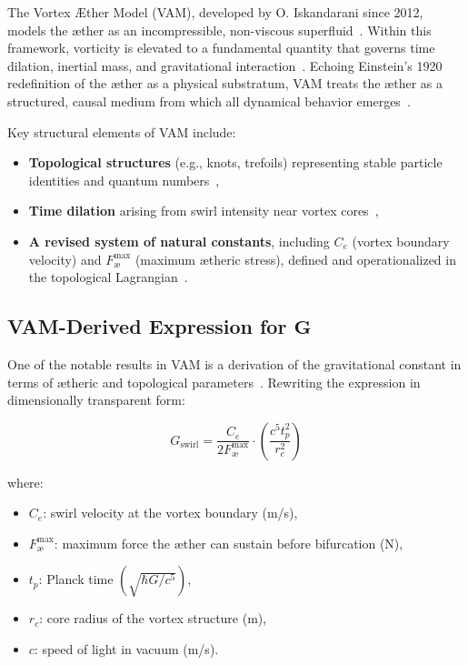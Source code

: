 The Vortex Æther Model (VAM), developed by O. Iskandarani since 2012, models the æther as an incompressible, non-viscous superfluid~\cite{VAM-8, VAM-13}. Within this framework, vorticity is elevated to a fundamental quantity that governs time dilation, inertial mass, and gravitational interaction~\cite{VAM-2, VAM-10, VAM-13}. Echoing Einstein’s 1920 redefinition of the æther as a physical substratum, VAM treats the æther as a structured, causal medium from which all dynamical behavior emerges~\cite{VAM-8}.

Key structural elements of VAM include:
\begin{itemize}
    \item \textbf{Topological structures} (e.g., knots, trefoils) representing stable particle identities and quantum numbers~\cite{VAM-8, VAM-11, VAM-14},
    \item \textbf{Time dilation} arising from swirl intensity near vortex cores~\cite{VAM-2, VAM-13},
    \item \textbf{A revised system of natural constants}, including $C_e$ (vortex boundary velocity) and $F^{\max}_{\text{\ae}}$ (maximum ætheric stress), defined and operationalized in the topological Lagrangian~\cite{VAM-14}.
\end{itemize}

\subsection*{VAM-Derived Expression for $\boldsymbol{G}$}

One of the notable results in VAM is a derivation of the gravitational constant in terms of ætheric and topological parameters~\cite{VAM-2, VAM-13, VAM-14}. Rewriting the expression in dimensionally transparent form:

\begin{equation}
    G_\text{swirl} = \frac{C_e}{2 F^{\max}_{\text{\ae}}} \cdot \left( \frac{c^5 t_p^2}{r_c^2} \right)
\end{equation}

\noindent where:
\begin{itemize}
    \item $C_e$: swirl velocity at the vortex boundary (m/s),
    \item $F^{\max}_{\text{\ae}}$: maximum force the æther can sustain before bifurcation (N),
    \item $t_p$: Planck time $ \left(\sqrt{\hbar G / c^5}\right) $,
    \item $r_c$: core radius of the vortex structure (m),
    \item $c$: speed of light in vacuum (m/s).
\end{itemize}


